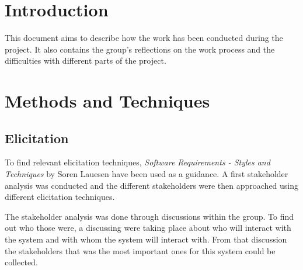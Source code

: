 \documentclass[10pt,a4paper]{article}
\begin{document}
\section{Introduction}
This document aims to describe how the work has been conducted during the project. It also contains the group's reflections on the work process and the difficulties with different parts of the project. 


\section{Methods and Techniques}

\subsection{Elicitation}
To find relevant elicitation techniques, \textit{Software Requirements - Styles and Techniques} by Soren Lauesen have been used as a guidance\cite{soren}. A first stakeholder analysis was conducted and the different stakeholders were then approached using different elicitation techniques.

The stakeholder analysis was done through discussions within the group. To find out who those were, a discussing were taking place about who will interact with the system and with whom the system will interact with. From that discussion the stakeholders that was the most important ones for this system could be collected.  
\end{document}
